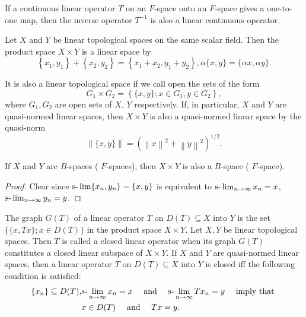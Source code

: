 \begin{theoremn} If a continuous linear operator $T$ on an $F$-space onto an $F$-space gives a one-to-one map, then the inverse operator $T^{-1}$ is also a linear continuous operator. 
\end{theoremn}


\label{sec:II.6}

\begin{definition}\label{def:II.6.Definition.1} Let $X$ and $Y$ be linear topological spaces on the same scalar field. Then the product space $X \times Y$ is a linear space by 
\[
\left\{x _{1}, y _{1} \right\} + \left\{x _{2}, y _{2} \right\} = \left\{x _{1} + x _{2}, y _{1} + y _{2} \right\}, \alpha \{x, y \} = \{\alpha x, \alpha y \}.
\]
\end{definition}

It is also a linear topological space if we call open the sets of the form 
\[
G _{1} \times G _{2} = \left\{\{x, y \}; x \in G _{1}, y \in G _{2} \right\},
\]
where $G_{1}, G_{2}$ are open sets of $X$, $Y$ respectively. If, in particular, $X$ and $Y$ are quasi-normed linear spaces, then $X \times Y$ is also a quasi-normed linear space by the quasi-norm 
\begin{equation}\label{eq:II.6.1}
\left\| \{x, y \} \right\| = \left(\left\| x \right\| ^{2} + \left\| y \right\| ^{2}\right) ^{1/2}.
\end{equation}

\begin{proposition}\label{prop:II.6.Proposition.1} If $X$ and $Y$ are $B$-spaces ( $F$-spaces), then $X \times Y$ is also a $B$-space ( $F$-space). 
\end{proposition}

\begin{proof}
 Clear since $\text{s-}\lim \{x_n, y_n\} = \{x, y\}$ is equivalent to $\text{s-}\lim\nolimits_{n \to \infty} x_n = x$, $\text{s-}\lim\nolimits_{n \to \infty} y_n = y$. 
\end{proof}

\begin{definition}\label{def:II.6.Definition.2} The graph $G(T)$ of a linear operator $T$ on $D(T) \subseteq X$ into $Y$ is the set $\{ \{x, Tx\}; x \in D(T) \}$ in the product space $X \times Y$. Let $X, Y$ be linear topological spaces. Then $T$ is called a closed linear operator when its graph $G(T)$ constitutes a closed linear subspace of $X \times Y$. If $X$ and $Y$ are quasi-normed linear spaces, then a linear operator $T$ on $D(T) \subseteq X$ into $Y$ is closed iff the following condition is satisfied: 
\begin{equation}\label{eq:II.6.2}
\begin{aligned}\left\{x _{n} \right\} \subseteq D (T),&\text{s-}\lim _{n \rightarrow \infty} x _{n} = x \quad \text{ and } \quad \text{s-}\lim _{n \rightarrow \infty} T x _{n} = y \quad \text{ imply that }\\&x \in D (T) \quad \text{ and } \quad T x = y.\end{aligned}
\end{equation}
\end{definition}

